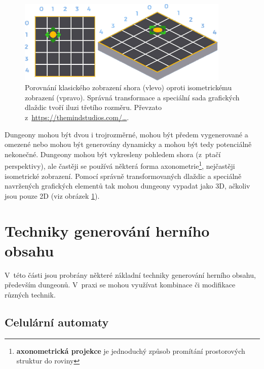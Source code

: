 \par
\begin{figure}[hbt]
    \centering
    \includegraphics[width=0.9\textwidth]{obrazky/top-down_vs_isometric.png}
    \caption{Porovnání klasického zobrazení shora (vlevo) oproti isometrickému zobrazení (vpravo). Správná transformace a speciální sada grafických dlaždic tvoří iluzi třetího rozměru. Převzato z~\href{https://themindstudios.com/blog/how-to-make-game-like-brawl-stars/}{https://themindstudios.com/\dots}.}
    \label{img:top-down_vs_isometric}
\end{figure}
Dungeony mohou být dvou i trojrozměrné, mohou být předem vygenerované a omezené nebo mohou být generovány dynamicky  a mohou být tedy potenciálně nekonečné.
Dungeony mohou být vykresleny pohledem shora (z~ptačí perspektivy), ale častěji se používá některá forma axonometrie\footnote{\textbf{axonometrická projekce} je jednoduchý způsob promítání prostorových struktur do roviny}, nejčastěji isometrické zobrazení.
Pomocí správně transformovaných dlaždic a speciálně navržených grafických elementů tak mohou dungeony vypadat jako 3D, ačkoliv jsou pouze 2D (viz obrázek \ref{img:top-down_vs_isometric}).


\section{Techniky generování herního obsahu}
\label{sec:techniky_generovani_herniho_obsahu}


V~této části jsou probrány některé základní techniky generování herního obsahu, především dungeonů.
V~praxi se mohou využívat kombinace či modifikace různých technik.


\subsection{Celulární automaty}

